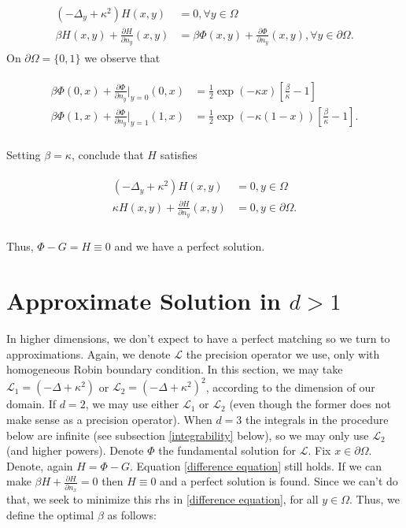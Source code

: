\documentclass[paper=a4, fontsize=11pt]{scrartcl} %
\numberwithin{equation}{section} %
\numberwithin{figure}{section} %
\numberwithin{table}{section} %
\newcommand{\Op}{\mathcal{L}}
\begin{document}
\begin{align}\label{difference equation}
  \begin{split} 
    (-\Delta_{y} + \kappa^2)H(x,y) &= 0, \forall y\in \Omega \\
    \beta H(x,y) + \frac{\partial H}{\partial n_{y}}(x,y) &= \beta \Phi(x,y) + \frac{\partial \Phi}{\partial n_{y}}(x,y), \forall y \in \partial \Omega.
  \end{split}
\end{align}
On $\partial \Omega = \{0,1\}$ we observe that

\begin{align*}
  \begin{split}
    \beta \Phi(0,x) + \frac{\partial \Phi}{\partial n_{y}}|_{y=0}(0,x) &= \frac{1}{2}\exp( -\kappa x)[ \frac{\beta}{\kappa} - 1] \\
    \beta \Phi(1,x) + \frac{\partial \Phi}{\partial n_{y}}|_{y=1}(1,x) &= \frac{1}{2} \exp (-\kappa (1-x)) [\frac{\beta}{\kappa} - 1 ].\\
  \end{split}
\end{align*}

Setting $\beta = \kappa$, conclude that $H$ satisfies

\begin{align*}
  \begin{split}
    (-\Delta_{y} + \kappa^2 ) H(x,y) &= 0 , y\in \Omega \\
    \kappa H(x,y) + \frac{\partial H}{\partial n_{y}}(x,y) &= 0 , y\in \partial \Omega.\\
  \end{split}
\end{align*}

Thus, $\Phi - G = H \equiv 0$ and we have a perfect solution.

\section{Approximate Solution in $d >1$}

In higher dimensions, we don't expect to have a perfect matching so we turn to approximations.
Again, we denote $\Op$ the precision operator we use, only with homogeneous Robin boundary condition.
In this section, we may take 
$\Op_{1} = (-\Delta + \kappa^2)$ or $\Op_{2} = (-\Delta + \kappa^2)^2$, 
according to the dimension of our domain. If $d=2$, we may use either $\Op_{1}$ or $\Op_{2}$ (even though the
former does not make sense as a precision operator). When $d=3$ the integrals in the procedure below are infinite
(see subsection \ref{integrability} below), so we
may only use $\Op_{2}$ (and higher powers). Denote $\Phi$ the fundamental
solution for $\Op$. Fix $x\in \partial \Omega$. Denote, again $H = \Phi - G$. Equation \ref{difference equation}
still holds. If we can make $\beta H + \frac{ \partial H}{\partial n_{x}} =0$ then $H\equiv 0$ and
a perfect solution is found. Since we can't do that, we seek to minimize this rhs in \ref{difference equation},
for all $y\in \Omega$. Thus, we define the optimal $\beta$ as follows:
\end{document}
